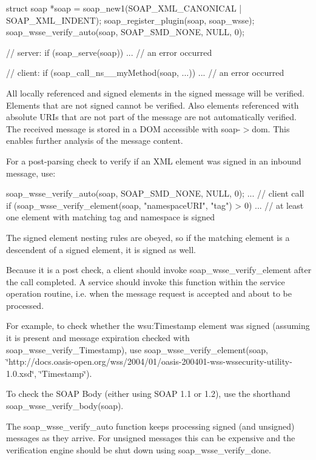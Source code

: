 \begin{DoxyCode}
    struct soap *soap = soap_new1(SOAP_XML_CANONICAL | SOAP_XML_INDENT);
    soap_register_plugin(soap, soap_wsse);
    soap_wsse_verify_auto(soap, SOAP_SMD_NONE, NULL, 0);

    // server:
    if (soap_serve(soap))
      ... // an error occurred

    // client:
    if (soap_call_ns__myMethod(soap, ...))
      ... // an error occurred
\end{DoxyCode}


All locally referenced and signed elements in the signed message will be verified. Elements that are not signed cannot be verified. Also elements referenced with absolute URIs that are not part of the message are not automatically verified. The received message is stored in a DOM accessible with soap-\/$>$dom. This enables further analysis of the message content.

For a post-\/parsing check to verify if an XML element was signed in an inbound message, use: 
\begin{DoxyCode}
    soap_wsse_verify_auto(soap, SOAP_SMD_NONE, NULL, 0);
    ... // client call
    if (soap_wsse_verify_element(soap, "namespaceURI", "tag") > 0)
      ... // at least one element with matching tag and namespace is signed
\end{DoxyCode}
 The signed element nesting rules are obeyed, so if the matching element is a descendent of a signed element, it is signed as well.

Because it is a post check, a client should invoke soap\_\-wsse\_\-verify\_\-element after the call completed. A service should invoke this function within the service operation routine, i.e. when the message request is accepted and about to be processed.

For example, to check whether the wsu:Timestamp element was signed (assuming it is present and message expiration checked with soap\_\-wsse\_\-verify\_\-Timestamp), use soap\_\-wsse\_\-verify\_\-element(soap, \char`\"{}http://docs.oasis-\/open.org/wss/2004/01/oasis-\/200401-\/wss-\/wssecurity-\/utility-\/1.0.xsd\char`\"{}, \char`\"{}Timestamp\char`\"{}).

To check the SOAP Body (either using SOAP 1.1 or 1.2), use the shorthand soap\_\-wsse\_\-verify\_\-body(soap).

The soap\_\-wsse\_\-verify\_\-auto function keeps processing signed (and unsigned) messages as they arrive. For unsigned messages this can be expensive and the verification engine should be shut down using soap\_\-wsse\_\-verify\_\-done.

